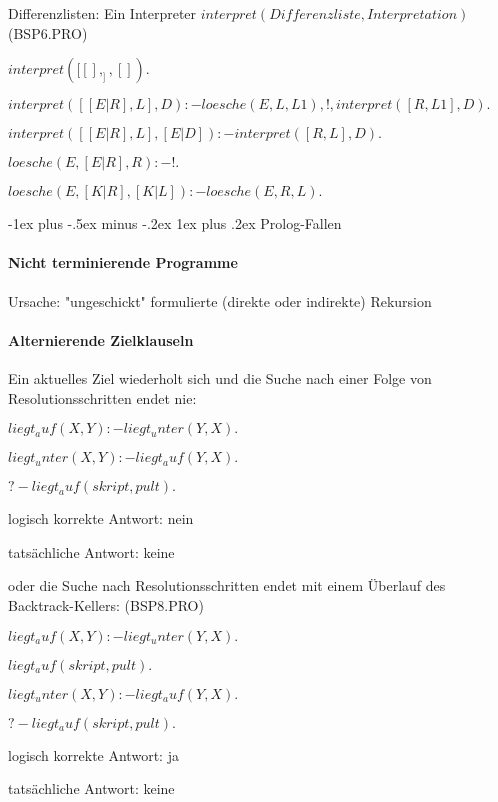 \documentclass[a4paper]{article}
\makeatletter
\renewcommand{\subsubsection}{\@startsection{subsubsection}{3}{0mm}%
                {-1ex plus -.5ex minus -.2ex}%
                {1ex plus .2ex}%
                {\normalfont\small\bfseries}}
\makeatother
\begin{document}
\begin{multicols}{3}
  Differenzlisten: Ein Interpreter $interpret(Differenzliste,Interpretation)$ (BSP6.PRO)
  \begin{enumerate*}
    \item $interpret([[],_],[]).$
    \item $interpret([[E|R],L] , D ) :- loesche(E , L, L1),! , interpret( [ R , L1 ] , D ).$
    \item $interpret([[E|R],L] , [E|D] ) :- interpret([R,L],D).$
    \item $loesche(E, [E|R], R) :-!.$
    \item $loesche(E, [K|R], [K|L]) :- loesche(E,R,L).$
  \end{enumerate*}

  \subsubsection{Prolog-Fallen}
  \paragraph{Nicht terminierende Programme }
  Ursache: "ungeschickt" formulierte (direkte oder indirekte) Rekursion

  \paragraph{Alternierende Zielklauseln}
  Ein aktuelles Ziel wiederholt sich und die Suche nach einer Folge von Resolutionsschritten endet nie:
  \begin{enumerate*}
    \item $liegt_auf(X,Y) :- liegt_unter(Y,X).$
    \item $liegt_unter(X,Y) :- liegt_auf(Y,X).$
  \end{enumerate*}
  \begin{itemize*}
    \item $?- liegt_auf( skript, pult ).$
    \item logisch korrekte Antwort: nein
    \item tatsächliche Antwort: keine
  \end{itemize*}

  oder die Suche nach Resolutionsschritten endet mit einem Überlauf des Backtrack-Kellers: (BSP8.PRO)
  \begin{enumerate*}
    \item $liegt_auf(X,Y) :- liegt_unter(Y,X).$
    \item $liegt_auf( skript , pult ).$
    \item $liegt_unter(X,Y) :- liegt_auf(Y,X).$
  \end{enumerate*}
  \begin{itemize*}
    \item $?- liegt_auf( skript , pult ).$
    \item logisch korrekte Antwort: ja
    \item tatsächliche Antwort: keine
  \end{itemize*}


\end{multicols}
\end{document}
